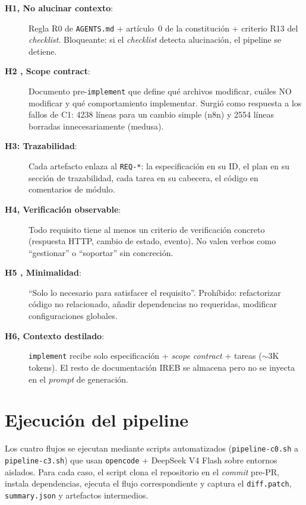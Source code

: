 \begin{description}
    \item[\textbf{H1,  No alucinar contexto}:] Regla R0 de \texttt{AGENTS.md} + art\'iculo~0 de la constituci\'on + criterio R13 del \emph{checklist}. Bloqueante: si el \emph{checklist} detecta alucinaci\'on, el pipeline se detiene.

    \item[\textbf{H2 , Scope contract}:] Documento pre-\texttt{implement} que define qu\'e archivos modificar, cu\'ales NO modificar y qu\'e comportamiento implementar. Surgi\'o como respuesta a los fallos de C1: 4238 l\'ineas para un cambio simple (n8n) y 2554 l\'ineas borradas innecesariamente (medusa).

    \item[\textbf{H3: Trazabilidad}:] Cada artefacto enlaza al \texttt{REQ-*}: la especificaci\'on en su ID, el plan en su secci\'on de trazabilidad, cada tarea en su cabecera, el c\'odigo en comentarios de m\'odulo.

    \item[\textbf{H4,  Verificaci\'on observable}:] Todo requisito tiene al menos un criterio de verificaci\'on concreto (respuesta HTTP, cambio de estado, evento). No valen verbos como ``gestionar'' o ``soportar'' sin concreci\'on.

    \item[\textbf{H5 , Minimalidad}:] ``Solo lo necesario para satisfacer el requisito''. Proh\'ibido: refactorizar c\'odigo no relacionado, a\~nadir dependencias no requeridas, modificar configuraciones globales.

    \item[\textbf{H6,  Contexto destilado}:] \texttt{implement} recibe solo especificaci\'on + \emph{scope contract} + tareas ($\sim$3K tokens). El resto de documentaci\'on IREB se almacena pero no se inyecta en el \emph{prompt} de generaci\'on.
\end{description}

\section{Ejecuci\'on del pipeline}

Los cuatro flujos se ejecutan mediante scripts automatizados (\texttt{pipeline-c0.sh} a \texttt{pipeline-c3.sh}) que usan \texttt{opencode} + DeepSeek V4 Flash sobre entornos aislados. Para cada caso, el script clona el repositorio en el \emph{commit} pre-PR, instala dependencias, ejecuta el flujo correspondiente y captura el \texttt{diff.patch}, \texttt{summary.json} y artefactos intermedios.

